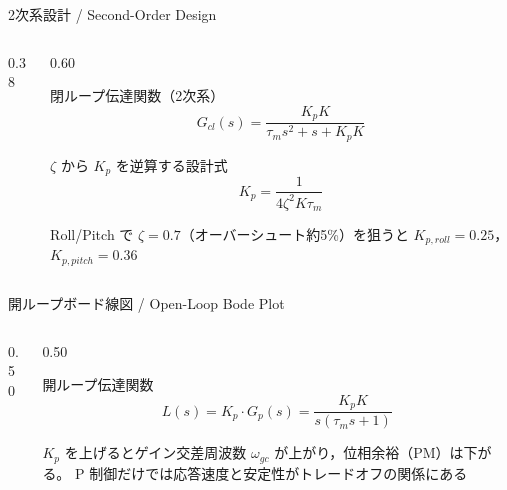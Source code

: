 \begin{frame}{2次系設計 / Second-Order Design}
  \vspace{-2mm}
  \begin{columns}[c]
    \begin{column}{0.38\textwidth}
      \centering
      \resizebox{\columnwidth}{!}{}
    \end{column}
    \begin{column}{0.60\textwidth}
      \begin{block}{閉ループ伝達関数（2次系）}
        \setlength{\abovedisplayskip}{2pt}\setlength{\belowdisplayskip}{2pt}%
        \setlength{\abovedisplayshortskip}{2pt}\setlength{\belowdisplayshortskip}{2pt}%
        \[
          G_{cl}(s) = \frac{K_p K}{\tau_m s^2 + s + K_p K}
        \]
      \end{block}

      \vspace{0.2em}

      \begin{block}{$\zeta$ から $K_p$ を逆算する設計式}
        \setlength{\abovedisplayskip}{2pt}\setlength{\belowdisplayskip}{2pt}%
        \setlength{\abovedisplayshortskip}{2pt}\setlength{\belowdisplayshortskip}{2pt}%
        \[
          K_p = \frac{1}{4\zeta^2 K \tau_m}
        \]
      \end{block}

      \vspace{0.2em}

      {\small
      Roll/Pitch で $\zeta = 0.7$（オーバーシュート約5\%）を狙うと
      $K_{p,roll}=0.25$，$K_{p,pitch}=0.36$}
    \end{column}
  \end{columns}
\end{frame}

\begin{frame}{開ループボード線図 / Open-Loop Bode Plot}
  \begin{columns}[c]
    \begin{column}{0.50\textwidth}
      \centering
      \resizebox{\columnwidth}{!}{}
    \end{column}
    \begin{column}{0.50\textwidth}
      \begin{block}{開ループ伝達関数}\small
        \setlength{\abovedisplayskip}{2pt}\setlength{\belowdisplayskip}{2pt}%
        \setlength{\abovedisplayshortskip}{2pt}\setlength{\belowdisplayshortskip}{2pt}%
        \[
          L(s) = K_p \cdot G_p(s) = \frac{K_p K}{s(\tau_m s + 1)}
        \]
      \end{block}

      \vspace{0.3em}

      {\small $K_p$ を上げるとゲイン交差周波数 $\omega_{gc}$ が上がり，位相余裕（PM）は下がる。
      P 制御だけでは応答速度と安定性がトレードオフの関係にある}
    \end{column}
  \end{columns}
\end{frame}

